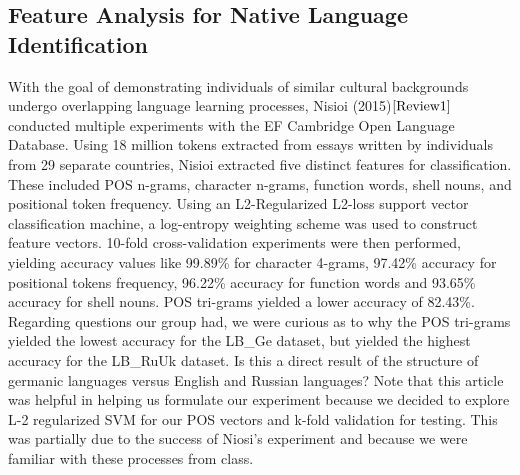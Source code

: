 \documentclass[12pt]{article}
\newcommand\tab[1][1cm]{\hspace*{#1}}
\begin{document}
\subsection{Feature Analysis for Native Language Identification}
\tab With the goal of demonstrating individuals of similar cultural backgrounds undergo overlapping language learning processes, Nisioi (2015)$\cite{Review1}$ conducted multiple experiments with the EF Cambridge Open Language Database. Using 18 million tokens extracted from essays written by individuals from 29 separate countries, Nisioi extracted five distinct features for classification. These included POS n-grams, character n-grams, function words, shell nouns, and positional token frequency. Using an L2-Regularized L2-loss support vector classification machine, a log-entropy weighting scheme was used to construct feature vectors. 10-fold cross-validation experiments were then performed, yielding accuracy values like 99.89\% for character 4-grams, 97.42\% accuracy for positional tokens frequency, 96.22\% accuracy for function words and 93.65\% accuracy for shell nouns. POS tri-grams yielded a lower accuracy of 82.43\%. Regarding questions our group had, we were curious as to why the POS tri-grams yielded the lowest accuracy for the LB\_Ge dataset, but yielded the highest accuracy for the LB\_RuUk dataset. Is this a direct result of the structure of germanic languages versus English and Russian languages? Note that this article was helpful in helping us formulate our experiment because we decided to explore L-2 regularized SVM for our POS vectors and k-fold validation for testing. This was partially due to the success of Niosi's experiment and because we were familiar with these processes from class. 
 
\end{document}
